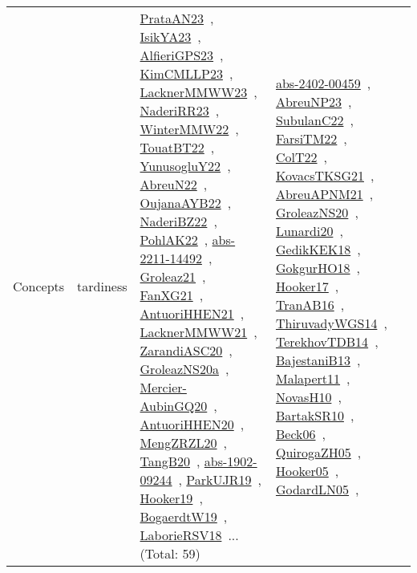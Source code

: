{\begin{longtable}{lp{3cm}>{\raggedright\arraybackslash}p{6cm}>{\raggedright\arraybackslash}p{6cm}>{\raggedright\arraybackslash}p{8cm}}
Concepts & tardiness & \href{works/PrataAN23.pdf}{PrataAN23}~\cite{PrataAN23}, \href{works/IsikYA23.pdf}{IsikYA23}~\cite{IsikYA23}, \href{works/AlfieriGPS23.pdf}{AlfieriGPS23}~\cite{AlfieriGPS23}, \href{works/KimCMLLP23.pdf}{KimCMLLP23}~\cite{KimCMLLP23}, \href{works/LacknerMMWW23.pdf}{LacknerMMWW23}~\cite{LacknerMMWW23}, \href{works/NaderiRR23.pdf}{NaderiRR23}~\cite{NaderiRR23}, \href{works/WinterMMW22.pdf}{WinterMMW22}~\cite{WinterMMW22}, \href{works/TouatBT22.pdf}{TouatBT22}~\cite{TouatBT22}, \href{works/YunusogluY22.pdf}{YunusogluY22}~\cite{YunusogluY22}, \href{works/AbreuN22.pdf}{AbreuN22}~\cite{AbreuN22}, \href{works/OujanaAYB22.pdf}{OujanaAYB22}~\cite{OujanaAYB22}, \href{works/NaderiBZ22.pdf}{NaderiBZ22}~\cite{NaderiBZ22}, \href{works/PohlAK22.pdf}{PohlAK22}~\cite{PohlAK22}, \href{works/abs-2211-14492.pdf}{abs-2211-14492}~\cite{abs-2211-14492}, \href{works/Groleaz21.pdf}{Groleaz21}~\cite{Groleaz21}, \href{works/FanXG21.pdf}{FanXG21}~\cite{FanXG21}, \href{works/AntuoriHHEN21.pdf}{AntuoriHHEN21}~\cite{AntuoriHHEN21}, \href{works/LacknerMMWW21.pdf}{LacknerMMWW21}~\cite{LacknerMMWW21}, \href{works/ZarandiASC20.pdf}{ZarandiASC20}~\cite{ZarandiASC20}, \href{works/GroleazNS20a.pdf}{GroleazNS20a}~\cite{GroleazNS20a}, \href{works/Mercier-AubinGQ20.pdf}{Mercier-AubinGQ20}~\cite{Mercier-AubinGQ20}, \href{works/AntuoriHHEN20.pdf}{AntuoriHHEN20}~\cite{AntuoriHHEN20}, \href{works/MengZRZL20.pdf}{MengZRZL20}~\cite{MengZRZL20}, \href{works/TangB20.pdf}{TangB20}~\cite{TangB20}, \href{works/abs-1902-09244.pdf}{abs-1902-09244}~\cite{abs-1902-09244}, \href{works/ParkUJR19.pdf}{ParkUJR19}~\cite{ParkUJR19}, \href{works/Hooker19.pdf}{Hooker19}~\cite{Hooker19}, \href{works/BogaerdtW19.pdf}{BogaerdtW19}~\cite{BogaerdtW19}, \href{works/LaborieRSV18.pdf}{LaborieRSV18}~\cite{LaborieRSV18}... (Total: 59) & \href{works/abs-2402-00459.pdf}{abs-2402-00459}~\cite{abs-2402-00459}, \href{works/AbreuNP23.pdf}{AbreuNP23}~\cite{AbreuNP23}, \href{works/SubulanC22.pdf}{SubulanC22}~\cite{SubulanC22}, \href{works/FarsiTM22.pdf}{FarsiTM22}~\cite{FarsiTM22}, \href{works/ColT22.pdf}{ColT22}~\cite{ColT22}, \href{works/KovacsTKSG21.pdf}{KovacsTKSG21}~\cite{KovacsTKSG21}, \href{works/AbreuAPNM21.pdf}{AbreuAPNM21}~\cite{AbreuAPNM21}, \href{works/GroleazNS20.pdf}{GroleazNS20}~\cite{GroleazNS20}, \href{works/Lunardi20.pdf}{Lunardi20}~\cite{Lunardi20}, \href{works/GedikKEK18.pdf}{GedikKEK18}~\cite{GedikKEK18}, \href{works/GokgurHO18.pdf}{GokgurHO18}~\cite{GokgurHO18}, \href{works/Hooker17.pdf}{Hooker17}~\cite{Hooker17}, \href{works/TranAB16.pdf}{TranAB16}~\cite{TranAB16}, \href{works/ThiruvadyWGS14.pdf}{ThiruvadyWGS14}~\cite{ThiruvadyWGS14}, \href{works/TerekhovTDB14.pdf}{TerekhovTDB14}~\cite{TerekhovTDB14}, \href{works/BajestaniB13.pdf}{BajestaniB13}~\cite{BajestaniB13}, \href{works/Malapert11.pdf}{Malapert11}~\cite{Malapert11}, \href{works/NovasH10.pdf}{NovasH10}~\cite{NovasH10}, \href{works/BartakSR10.pdf}{BartakSR10}~\cite{BartakSR10}, \href{works/Beck06.pdf}{Beck06}~\cite{Beck06}, \href{works/QuirogaZH05.pdf}{QuirogaZH05}~\cite{QuirogaZH05}, \href{works/Hooker05.pdf}{Hooker05}~\cite{Hooker05}, \href{works/GodardLN05.pdf}{GodardLN05}~\cite{GodardLN05}, 
\end{longtable}}

